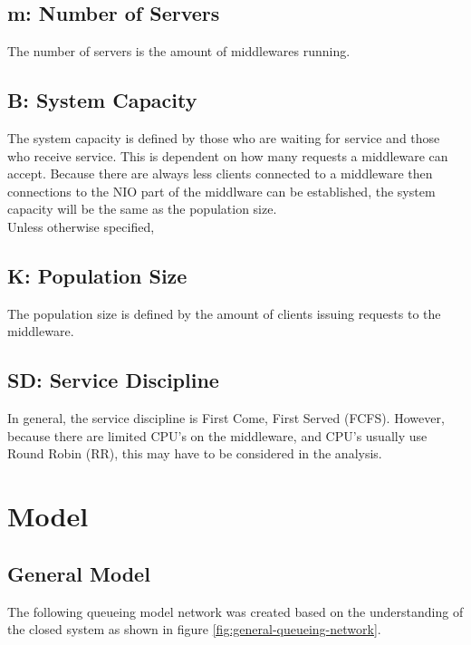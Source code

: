 \documentclass[a4paper]{article}
\begin{document}
{\subsection{m: Number of Servers}

The number of servers is the amount of middlewares running.

\subsection{B: System Capacity}

The system capacity is defined by those who are waiting for service and those who receive service.  This is dependent on how many requests a middleware can accept. Because there are always less clients connected to a middleware then connections to the NIO part of the middlware can be established, the system capacity will be the same as the population size.\\

Unless otherwise specified, 

\subsection{K: Population Size}

The population size is defined by the amount of clients issuing requests to the middleware.

\subsection{SD: Service Discipline}

In general, the service discipline is First Come, First Served (FCFS). However, because there are limited CPU's on the middleware, and CPU's usually use Round Robin (RR), this may have to be considered in the analysis.


\section{Model}

\subsection{General Model}

The following queueing model network was created based on the understanding of the closed system as shown in figure \ref{fig:general-queueing-network}.

}
\end{document}
